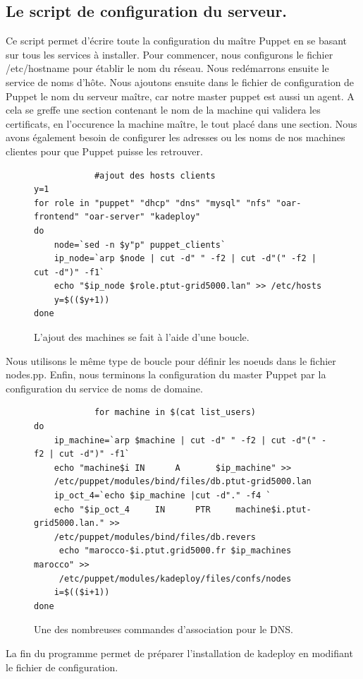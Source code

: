 \documentclass[a4paper,10pt]{article}
\begin{document}
		\subsection{Le script de configuration du serveur.}
		Ce script permet d'écrire toute la configuration du maître Puppet en se basant sur tous les services à  installer. Pour commencer, nous configurons le fichier /etc/hostname pour établir le nom du réseau. Nous redémarrons ensuite le service de noms d'hôte.
		Nous ajoutons ensuite dans le fichier de configuration de Puppet le nom du serveur maître, car notre master puppet est aussi un agent. A cela se greffe une section contenant le nom de la machine qui validera les certificats, en l'occurence la machine maître, le tout placé dans une section.
		Nous avons également besoin de configurer les adresses ou les noms de nos machines clientes pour que Puppet puisse les retrouver. 		
		\begin{figure}[!h]
			\centering
			\begin{verbatim}			#ajout des hosts clients
y=1
for role in "puppet" "dhcp" "dns" "mysql" "nfs" "oar-frontend" "oar-server" "kadeploy"
do
	node=`sed -n $y"p" puppet_clients`
	ip_node=`arp $node | cut -d" " -f2 | cut -d"(" -f2 | cut -d")" -f1`
	echo "$ip_node $role.ptut-grid5000.lan" >> /etc/hosts
	y=$(($y+1))
done
			\end{verbatim}
			\caption{L'ajout des machines se fait à l'aide d'une boucle.}
			\label{Ajout Machines dans nodes.pp}
		\end{figure}
	
	Nous utilisons le m\^eme type de boucle pour définir les noeuds dans le fichier nodes.pp.
		 Enfin, nous terminons la configuration du master Puppet par la configuration du service de noms de domaine.
		\begin{figure}[!h]
			\centering
			\begin{verbatim}			
			for machine in $(cat list_users)
do
	ip_machine=`arp $machine | cut -d" " -f2 | cut -d"(" -f2 | cut -d")" -f1`
	echo "machine$i	IN		A		$ip_machine" >> 
	/etc/puppet/modules/bind/files/db.ptut-grid5000.lan
	ip_oct_4=`echo $ip_machine |cut -d"." -f4 `
	echo "$ip_oct_4		IN		PTR		machine$i.ptut-grid5000.lan." >> 
	/etc/puppet/modules/bind/files/db.revers
	 echo "marocco-$i.ptut.grid5000.fr $ip_machines marocco" >> 
	 /etc/puppet/modules/kadeploy/files/confs/nodes 	
	i=$(($i+1))
done
			\end{verbatim}
			\caption{Une des nombreuses commandes d'association pour le DNS.}
			\label{configDNS}
		\end{figure}
		La fin du programme permet de préparer l'installation de kadeploy en modifiant le fichier de configuration.
\newpage
\end{document}
